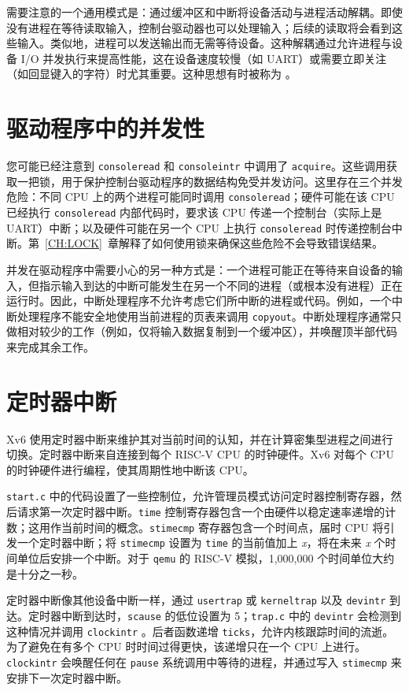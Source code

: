 需要注意的一个通用模式是：通过缓冲区和中断将设备活动与进程活动解耦。即使没有进程在等待读取输入，控制台驱动器也可以处理输入；后续的读取将会看到这些输入。类似地，进程可以发送输出而无需等待设备。这种解耦通过允许进程与设备 I/O 并发执行来提高性能，这在设备速度较慢（如 UART）或需要立即关注（如回显键入的字符）时尤其重要。这种思想有时被称为 。

\section{驱动程序中的并发性}

您可能已经注意到 {\tt consoleread} 和 {\tt consoleintr} 中调用了 {\tt acquire}。这些调用获取一把锁，用于保护控制台驱动程序的数据结构免受并发访问。这里存在三个并发危险：不同 CPU 上的两个进程可能同时调用 {\tt consoleread}；硬件可能在该 CPU 已经执行 {\tt consoleread} 内部代码时，要求该 CPU 传递一个控制台（实际上是 UART）中断；以及硬件可能在另一个 CPU 上执行 {\tt consoleread} 时传递控制台中断。第~\ref{CH:LOCK}~章解释了如何使用锁来确保这些危险不会导致错误结果。

并发在驱动程序中需要小心的另一种方式是：一个进程可能正在等待来自设备的输入，但指示输入到达的中断可能发生在另一个不同的进程（或根本没有进程）正在运行时。因此，中断处理程序不允许考虑它们所中断的进程或代码。例如，一个中断处理程序不能安全地使用当前进程的页表来调用 {\tt copyout}。中断处理程序通常只做相对较少的工作（例如，仅将输入数据复制到一个缓冲区），并唤醒顶半部代码来完成其余工作。

\section{定时器中断}

Xv6 使用定时器中断来维护其对当前时间的认知，并在计算密集型进程之间进行切换。定时器中断来自连接到每个 RISC-V CPU 的时钟硬件。Xv6 对每个 CPU 的时钟硬件进行编程，使其周期性地中断该 CPU。

{\tt start.c}  中的代码设置了一些控制位，允许管理员模式访问定时器控制寄存器，然后请求第一次定时器中断。{\tt time} 控制寄存器包含一个由硬件以稳定速率递增的计数；这用作当前时间的概念。{\tt stimecmp} 寄存器包含一个时间点，届时 CPU 将引发一个定时器中断；将 {\tt stimecmp} 设置为 {\tt time} 的当前值加上 {\it x}，将在未来 {\it x} 个时间单位后安排一个中断。对于 {\tt qemu} 的 RISC-V 模拟，1,000,000 个时间单位大约是十分之一秒。

定时器中断像其他设备中断一样，通过 {\tt usertrap} 或 {\tt kerneltrap} 以及 {\tt devintr} 到达。定时器中断到达时，{\tt scause} 的低位设置为 5；{\tt trap.c} 中的 {\tt devintr} 会检测到这种情况并调用 {\tt clockintr} 。后者函数递增 {\tt ticks}，允许内核跟踪时间的流逝。为了避免在有多个 CPU 时时间过得更快，该递增只在一个 CPU 上进行。{\tt clockintr} 会唤醒任何在 {\tt pause} 系统调用中等待的进程，并通过写入 {\tt stimecmp} 来安排下一次定时器中断。

